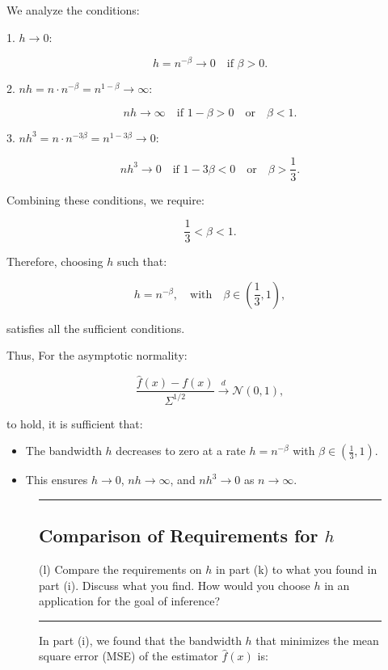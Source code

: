 \documentclass{article}
\newenvironment{colorparagraph}[1]{\par\color{#1}}{\par}
\begin{document}
We analyze the conditions:

1. \( h \to 0 \):

\[
h = n^{-\beta} \to 0 \quad \text{if } \beta > 0.
\]

2. \( n h = n \cdot n^{-\beta} = n^{1 - \beta} \to \infty \):

\[
n h \to \infty \quad \text{if } 1 - \beta > 0 \quad \text{or} \quad \beta < 1.
\]

3. \( n h^3 = n \cdot n^{-3\beta} = n^{1 - 3\beta} \to 0 \):

\[
n h^3 \to 0 \quad \text{if } 1 - 3\beta < 0 \quad \text{or} \quad \beta > \frac{1}{3}.
\]

Combining these conditions, we require:

\[
\frac{1}{3} < \beta < 1.
\]

Therefore, choosing \( h \) such that:

\[
h = n^{-\beta}, \quad \text{with} \quad \beta \in \left( \frac{1}{3}, 1 \right),
\]

satisfies all the sufficient conditions.

Thus, For the asymptotic normality:

\[
\frac{\hat{f}(x) - f(x)}{\Sigma^{1/2}} \xrightarrow{d} \mathcal{N}(0, 1),
\]

to hold, it is sufficient that:

\begin{itemize}
    \item The bandwidth \( h \) decreases to zero at a rate \( h = n^{-\beta} \) with \( \beta \in \left( \frac{1}{3}, 1 \right) \).
    \item This ensures \( h \to 0 \), \( n h \to \infty \), and \( n h^3 \to 0 \) as \( n \to \infty \).
\end{itemize}

\begin{figure}[H]
\begin{colorparagraph}{questioncolor}
\label{q2l}
\rule{\textwidth}{0.5pt}
\subsection{Comparison of Requirements for \( h \)}
(l) Compare the requirements on \( h \) in part (k) to what you found in part (i). Discuss what you find. How would you choose \( h \) in an application for the goal of inference?

\rule{\textwidth}{0.5pt}
\end{colorparagraph}

In part (i), we found that the bandwidth \( h \) that minimizes the mean square error (MSE) of the estimator \( \hat{f}(x) \) is:
\end{figure}
\end{document}
